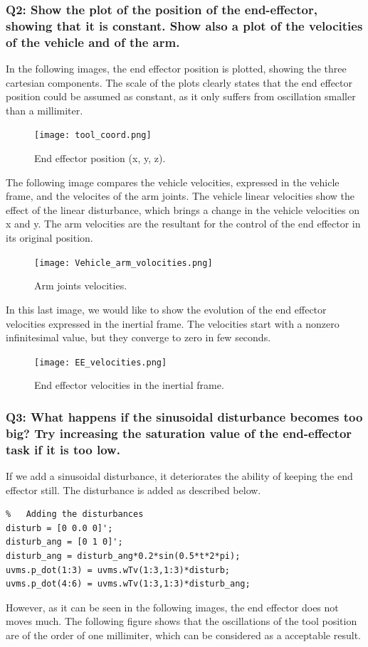 \documentclass{article}
\begin{document}
\subsubsection{Q2: Show the plot of the position of the end-effector, showing that it is constant. Show also a plot of the velocities of the vehicle and of the arm.}
In the following images, the end effector position is plotted, showing the three cartesian components. The scale of the plots clearly states that the end effector position could be assumed as constant, as it only suffers from oscillation smaller than a millimiter. 

\begin{figure}[H]
	\centering
	{\texttt{[image: tool\_coord.png]}}
	\caption{End effector position (x, y, z).}
	\label{im:tool_cord1}
\end{figure}


The following image compares the vehicle velocities, expressed in the vehicle frame, and the velocites of the arm joints. The vehicle linear velocities show the effect of the linear disturbance, which brings a change in the vehicle velocities on x and y. 
The arm velocities are the resultant for the control of the end effector in its original position. 

\begin{figure}[H]
	\centering
	{\texttt{[image: Vehicle\_arm\_volocities.png]}}
	\caption{Arm joints velocities.}
	\label{im:arm_vel1}
\end{figure}

In this last image, we would like to show the evolution of the end effector velocities expressed in the inertial frame. The velocities start with a nonzero infinitesimal value, but they converge to zero in few seconds.

\begin{figure}[H]
	\centering
	{\texttt{[image: EE\_velocities.png]}}
	\caption{End effector velocities in the inertial frame.}
	\label{im:tool_vel1}
\end{figure}


\subsubsection{Q3: What happens if the sinusoidal disturbance becomes too big? Try increasing the saturation value of the end-effector task if it is too low.}
If we add a sinusoidal disturbance, it deteriorates the ability of keeping the end effector still. The disturbance is added as described below. 
\begin{lstlisting}
%	Adding the disturbances
disturb = [0 0.0 0]';
disturb_ang = [0 1 0]';
disturb_ang = disturb_ang*0.2*sin(0.5*t*2*pi);
uvms.p_dot(1:3) = uvms.wTv(1:3,1:3)*disturb;
uvms.p_dot(4:6) = uvms.wTv(1:3,1:3)*disturb_ang;
\end{lstlisting}
However, as it can be seen in the following images, the end effector does not moves much. 
The following figure shows that the oscillations of the tool position are of the order of one millimiter, which can be considered as a acceptable result.  \\
\end{document}
